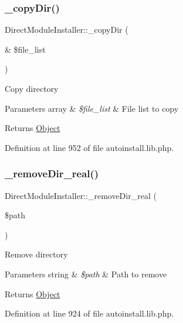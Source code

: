 \subsubsection{\texorpdfstring{\+\_\+copy\+Dir()}{\_copyDir()}}
{\footnotesize\ttfamily Direct\+Module\+Installer\+::\+\_\+copy\+Dir (\begin{DoxyParamCaption}\item[{\&}]{\$file\+\_\+list }\end{DoxyParamCaption})}

Copy directory


\begin{DoxyParams}[1]{Parameters}
array & {\em \$file\+\_\+list} & File list to copy \\
\hline
\end{DoxyParams}
\begin{DoxyReturn}{Returns}
\hyperlink{classObject}{Object} 
\end{DoxyReturn}


Definition at line 952 of file autoinstall.\+lib.\+php.

\hypertarget{classDirectModuleInstaller_aec81874ceba294e9a63ad515c2a15c87}{}\label{classDirectModuleInstaller_aec81874ceba294e9a63ad515c2a15c87} 
\subsubsection{\texorpdfstring{\+\_\+remove\+Dir\+\_\+real()}{\_removeDir\_real()}}
{\footnotesize\ttfamily Direct\+Module\+Installer\+::\+\_\+remove\+Dir\+\_\+real (\begin{DoxyParamCaption}\item[{}]{\$path }\end{DoxyParamCaption})}

Remove directory 
\begin{DoxyParams}[1]{Parameters}
string & {\em \$path} & Path to remove \\
\hline
\end{DoxyParams}
\begin{DoxyReturn}{Returns}
\hyperlink{classObject}{Object} 
\end{DoxyReturn}


Definition at line 924 of file autoinstall.\+lib.\+php.

\hypertarget{classDirectModuleInstaller_a6fb855a965f6b16e450b4c97f2a79ca2}{}\label{classDirectModuleInstaller_a6fb855a965f6b16e450b4c97f2a79ca2} 
